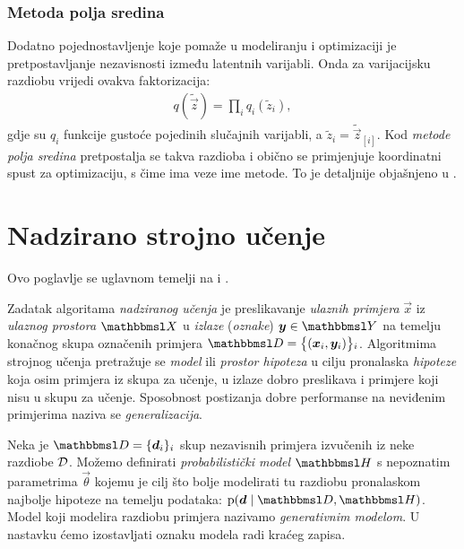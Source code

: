 \documentclass[utf8, diplomski, lmodern]{fer}
\begin{document}
\subsection{Metoda polja sredina}

Dodatno pojednostavljenje koje pomaže u modeliranju i optimizaciji je pretpostavljanje nezavisnosti između latentnih varijabli. Onda za varijacijsku razdiobu vrijedi ovakva faktorizacija:
\begin{align}
q(\tilde{\vec z}) = \prod_i q_i(\tilde{z}_i),
\end{align}
gdje su $q_i$ funkcije gustoće pojedinih slučajnih varijabli, a $\tilde{z}_i=\tilde{\vec z}_{[i]}$. Kod \emph{metode polja sredina} pretpostalja se takva razdioba i obično se primjenjuje koordinatni spust za optimizaciju, s čime ima veze ime metode. To je detaljnije objašnjeno u \citet{Murphy:2012:MLPP}.

\iffalse
Neka je radi kraćeg zapisa $t(\tilde{\vec z}) \coloneqq \p(\rvec z=\tilde{\vec z},\rvec x=\vec x)$. Uz aproksimaciju polja sredina donja varijacijska granica postaje
\begin{align}
L_{\vec x}(\tilde{\rvec z}) 
&= \E_{\tilde{\rvec z}}\sbr{\ln t(\tilde{\vec z}) - \ln q(\tilde{\vec z})}
\\
&= \int\dif{\tilde{\vec z}} \del{\prod_i q_i(\tilde{z}_i)}\del{\ln t(\tilde{\vec z}) - \sum_j \ln q_j(\tilde{z}_j)}
\text{.}
\end{align}
\fi



\chapter{Nadzirano strojno učenje} \label{chap:nsu}

Ovo poglavlje se uglavnom temelji na \citet{Snajder:2014:SU} i \citet{Goodfellow:2016:DL}.

Zadatak algoritama \emph{nadziranog učenja} je preslikavanje \emph{ulaznih primjera} $\vec x$ iz \emph{ulaznog prostora} $\set{X}$ u \emph{izlaze} (\emph{oznake}) $\vec y\in\set{Y}$ na temelju konačnog skupa označenih primjera $\set{D} = \cbr{\del{\vec x_i,\vec y_i}}_{i}$. Algoritmima strojnog učenja pretražuje se \emph{model} ili \emph{prostor hipoteza} u cilju pronalaska \emph{hipoteze} koja osim primjera iz skupa za učenje, u izlaze dobro preslikava i primjere koji nisu u skupu za učenje. Sposobnost postizanja dobre performanse na neviđenim primjerima naziva se \emph{generalizacija}.

Neka je $\set{D}=\cbr{\vec d_i}_i$ skup nezavisnih primjera izvučenih iz neke razdiobe $\mathcal{D}$. Možemo definirati \emph{probabilistički model} $\set H$ s nepoznatim parametrima $\vec\theta$ kojemu je cilj što bolje modelirati tu razdiobu pronalaskom najbolje hipoteze na temelju podataka: $\p(\vec{d}\mid\set{D},\set H)$. Model koji modelira razdiobu primjera nazivamo \emph{generativnim modelom}. U nastavku ćemo izostavljati oznaku modela radi kraćeg zapisa.
\end{document}
